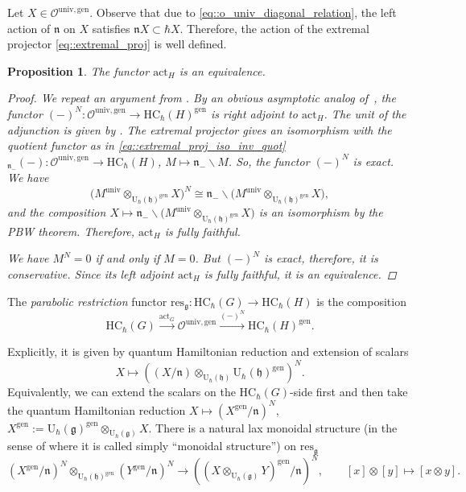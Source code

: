 \documentclass[10pt,a4paper]{article}
\numberwithin{equation}{section}
\newtheorem{Proposition}[Theorem]{Proposition}
{ \theoremstyle{definition}
	\newtheorem{Definition}[Theorem]{Definition}
	\newtheorem{Note}[Theorem]{Note}
	\newtheorem{Example}[Theorem]{Example}
	\newtheorem{Remark}[Theorem]{Remark} }
\newcommand{\cO}{\mathcal{O}}
\newcommand{\U}{\mathrm{U}_{\hbar}}
\newcommand{\g}{\mathfrak{g}}
\newcommand{\h}{\mathfrak{h}}
\newcommand{\n}{\mathfrak{n}}
\newcommand{\act}{\mathrm{act}}
\newcommand{\gen}{\mathrm{gen}}
\newcommand{\HC}{\mathrm{HC}_{\hbar}}
\newcommand{\res}{\mathrm{res}}
\newcommand{\univ}{\mathrm{univ}}
\begin{document}
	Let $X\in \cO^{\univ,\gen}$. Observe that due to \eqref{eq::o_univ_diagonal_relation}, the left action of $\n$ on $X$ satisfies $\n X \subset \hbar X$. Therefore, the action of the extremal projector \eqref{eq::extremal_proj} is well defined.
	
	\begin{Proposition}
		\label{prop::act_equiv}
		The functor $\act_H$ is an equivalence.
		\begin{proof}
			We repeat an argument from \cite[Theorem 4.17]{KalmykovSafronov}. By an obvious asymptotic analog of~\cite[Proposition 4.6]{KalmykovSafronov}, the functor $(-)^{N}\colon \cO^{\univ,\gen} \rightarrow \HC(H)^{\gen}$ is right adjoint to $\act_H$. The unit of the adjunction is given by
			\smash{$
			X \mapsto \bigl(M^{\univ} \otimes_{\U(\h)^{\gen}} X\bigr)^{N}$}.
			The extremal projector gives an isomorphism with the quotient functor as in \eqref{eq::extremal_proj_iso_inv_quot}
$
			{}_{\n_-}(-)\colon \cO^{\univ,\gen} \rightarrow \HC(H)$, $ M \mapsto \n_- \backslash M$.
			So, the functor $(-)^{N}$ is exact. We have
			\[
			\bigl(M^{\univ} \otimes_{\U(\h)^{\gen}} X\bigr)^{N} \cong \n_- \backslash \bigl(M^{\univ} \otimes_{\U(\h)^{\gen}} X\bigr),
			\]
			and the composition
			$
			X \mapsto \n_- \backslash \bigl(M^{\univ} \otimes_{\U(\h)^{\gen}} X\bigr)
			$
			is an isomorphism by the PBW theorem. Therefore, $\act_H$ is fully faithful.
			
			We have $M^{N} = 0$ if and only if $M=0$. But $(-)^{N}$ is exact, therefore, it is conservative. Since its left adjoint $\act_H$ is fully faithful, it is an equivalence.
		\end{proof}
	\end{Proposition}
	
	\begin{Definition}
		\label{def::parabolic_reduction}
		The \emph{parabolic restriction} functor $\res_{\g}\colon \HC(G) \rightarrow \HC(H)$ is the composition
		\[
		\HC(G) \xrightarrow{\act_G} \cO^{\univ,\gen} \xrightarrow{(-)^{N}} \HC(H)^{\gen}.
		\]
	\end{Definition}
	Explicitly, it is given by quantum Hamiltonian reduction and extension of scalars
	\[
	X \mapsto ((X/ \n) \otimes_{\U(\h)} \U(\h)^{\gen})^{N}.
	\]
	Equivalently, we can extend the scalars on the $\HC(G)$-side first and then take the quantum Hamiltonian reduction
$
	X \mapsto (X^{\gen}/ \n )^{N}$, $ X^{\gen} := \U(\g)^{\gen} \otimes_{\U(\g)} X$.
	There is a natural lax monoidal structure (in the sense of \cite[Section XI.2]{Maclane} where it is called simply ``monoidal structure'') on $\res_{\g}$
	\[%
		(X^{\gen}/\n)^{N} \otimes_{\U(\h)^{\gen}} (Y^{\gen}/\n)^{N} \rightarrow ((X \otimes_{\U(\g)} Y)^{\gen} / \n)^{N}, \qquad [x] \otimes [y] \mapsto [x\otimes y].
	\]
	
\end{document}
